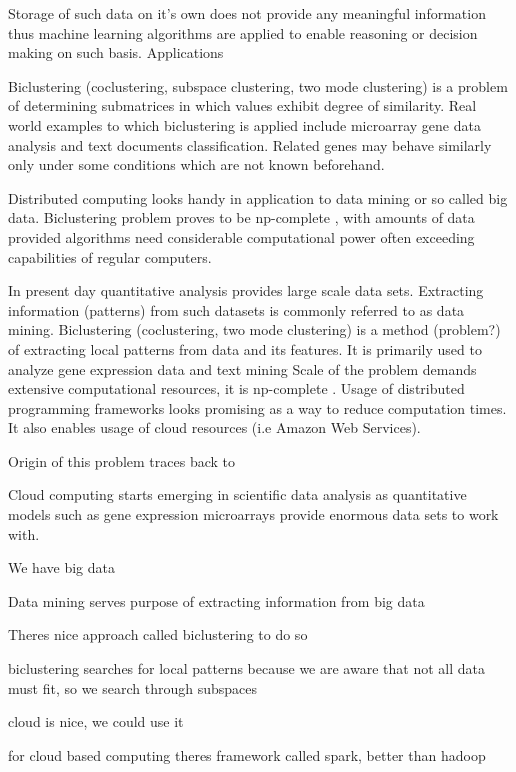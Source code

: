  
Storage of such data on it's own does not provide any meaningful information thus machine learning algorithms are applied to enable reasoning or decision making on such basis. Applications 



Biclustering (coclustering, subspace clustering, two mode clustering) is a problem of determining submatrices in which values exhibit degree of similarity. Real world examples to which biclustering is applied include microarray gene data analysis and text documents classification. Related genes may behave similarly only under some conditions which are not known beforehand.

Distributed computing looks handy in application to data mining or so called big data. Biclustering problem proves to be np-complete \cite{2004_survey}, with amounts of data provided algorithms need considerable computational power often exceeding capabilities of regular computers.

In present day quantitative analysis provides large scale data sets. Extracting information (patterns) from such datasets is commonly referred to as data mining. Biclustering (coclustering, two mode clustering) is a method (problem?) of extracting local patterns from data and its features.
It is primarily used to analyze gene expression data \cite{2004_survey} and text mining
Scale of the problem demands extensive computational resources, it is np-complete \cite{2004_survey}.
Usage of distributed programming frameworks looks promising as a way to reduce computation times. It also enables usage of cloud resources (i.e Amazon Web Services).


Origin of this problem traces back to \cite{}

Cloud computing starts emerging in scientific data analysis as quantitative models such as gene expression microarrays provide enormous data sets to work with. 

We have big data

Data mining serves purpose of extracting information from big data

Theres nice approach called biclustering to do so

biclustering searches for local patterns because we are aware that not all data must fit, so we search through subspaces

cloud is nice, we could use it

for cloud based computing theres framework called spark, better than hadoop

